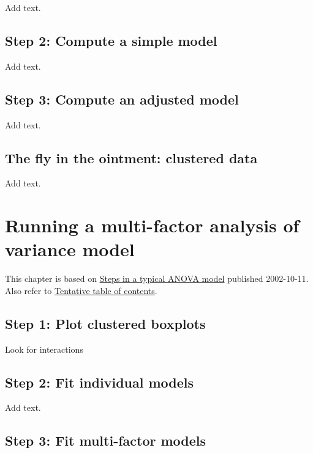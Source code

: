 \documentclass[
  letterpaper,
  DIV=11,
  numbers=noendperiod]{scrreprt}
\begin{document}
Add text.

\section{Step 2: Compute a simple
model}\label{step-2-compute-a-simple-model-1}

Add text.

\section{Step 3: Compute an adjusted
model}\label{step-3-compute-an-adjusted-model-1}

Add text.

\section{The fly in the ointment: clustered
data}\label{the-fly-in-the-ointment-clustered-data-1}

Add text.


\chapter{Running a multi-factor analysis of variance
model}\label{running-a-multi-factor-analysis-of-variance-model}

This chapter is based on \href{http://www.pmean.com/posts/anova/}{Steps
in a typical ANOVA model} published 2002-10-11. Also refer to
\href{http://www.pmean.com/10/Contents.html}{Tentative table of
contents}.

\section{Step 1: Plot clustered
boxplots}\label{step-1-plot-clustered-boxplots}

Look for interactions

\section{Step 2: Fit individual
models}\label{step-2-fit-individual-models}

Add text.

\section{Step 3: Fit multi-factor
models}\label{step-3-fit-multi-factor-models}
\end{document}
